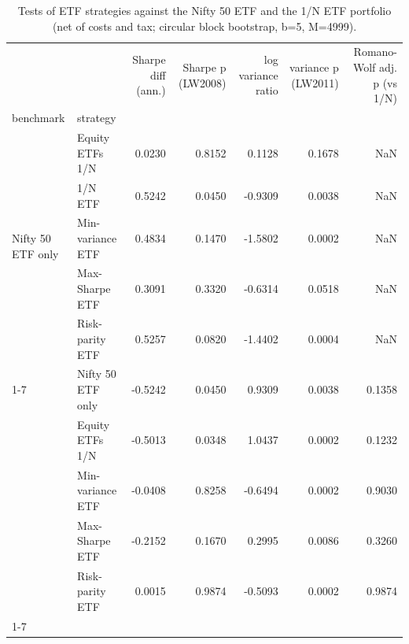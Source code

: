\begin{table}
\caption{Tests of ETF strategies against the Nifty 50 ETF and the 1/N ETF portfolio (net of costs and tax; circular block bootstrap, b=5, M=4999).}
\label{tab:T09_tests_etf}
\begin{tabular}{llrrrrr}
\toprule
 &  & Sharpe diff (ann.) & Sharpe p (LW2008) & log variance ratio & variance p (LW2011) & Romano-Wolf adj. p (vs 1/N) \\
benchmark & strategy &  &  &  &  &  \\
\midrule
\multirow[t]{5}{*}{Nifty 50 ETF only} & Equity ETFs 1/N & 0.0230 & 0.8152 & 0.1128 & 0.1678 & NaN \\
 & 1/N ETF & 0.5242 & 0.0450 & -0.9309 & 0.0038 & NaN \\
 & Min-variance ETF & 0.4834 & 0.1470 & -1.5802 & 0.0002 & NaN \\
 & Max-Sharpe ETF & 0.3091 & 0.3320 & -0.6314 & 0.0518 & NaN \\
 & Risk-parity ETF & 0.5257 & 0.0820 & -1.4402 & 0.0004 & NaN \\
\cline{1-7}
\multirow[t]{5}{*}{1/N ETF} & Nifty 50 ETF only & -0.5242 & 0.0450 & 0.9309 & 0.0038 & 0.1358 \\
 & Equity ETFs 1/N & -0.5013 & 0.0348 & 1.0437 & 0.0002 & 0.1232 \\
 & Min-variance ETF & -0.0408 & 0.8258 & -0.6494 & 0.0002 & 0.9030 \\
 & Max-Sharpe ETF & -0.2152 & 0.1670 & 0.2995 & 0.0086 & 0.3260 \\
 & Risk-parity ETF & 0.0015 & 0.9874 & -0.5093 & 0.0002 & 0.9874 \\
\cline{1-7}
\bottomrule
\end{tabular}
\end{table}
